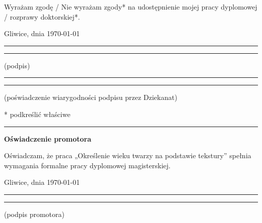 \documentclass[a4paper,twoside,12pt]{book}
\newcommand{\tytul}{Określenie wieku twarzy na podstawie tekstury}
\begin{document}
    \vfill

    Wyrażam zgodę / Nie wyrażam zgody* na udostępnienie mojej pracy dyplomowej / rozprawy doktorskiej*.

    \vfill

    Gliwice, dnia \today

    \vfill

    \rule{0.5\textwidth}{0cm}\dotfill

    \rule{0.5\textwidth}{0cm}
    \begin{minipage}{0.45\textwidth}
    {\begin{center}
         (podpis)
    \end{center}}
    \end{minipage}

    \vfill

    \rule{0.5\textwidth}{0cm}\dotfill

    \rule{0.5\textwidth}{0cm}
    \begin{minipage}{0.45\textwidth}
    {\begin{center}
         \rule{0mm}{5mm}(poświadczenie wiarygodności podpisu przez Dziekanat)
    \end{center}}
    \end{minipage}


    \vfill

    * podkreślić właściwe




    \cleardoublepage

    \rule{1cm}{0cm}

    \vfill

    \begin{center}
        \Large\bfseries Oświadczenie promotora
    \end{center}

    \vfill

    Oświadczam, że praca „\tytul” spełnia wymagania formalne pracy dyplomowej magisterskiej.

    \vfill



    \vfill

    Gliwice, dnia \today

    \rule{0.5\textwidth}{0cm}\dotfill

    \rule{0.5\textwidth}{0cm}
    \begin{minipage}{0.45\textwidth}
    {\begin{center}
         (podpis promotora)
    \end{center}}
    \end{minipage}
\end{document}
